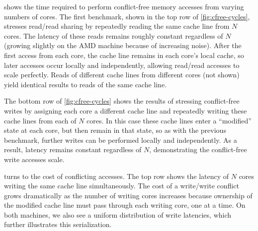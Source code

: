  shows the time required to perform
conflict-free memory accesses from varying numbers of cores.  The
first benchmark, shown in the top row of \cref{fig:cfree-cycles},
stresses read/read sharing by repeatedly reading the same cache line
from $N$ cores.  The latency of these reads remains roughly constant
regardless of $N$ (growing slightly on the AMD machine because of
increasing noise).  After the first access from each core, the cache
line remains in each core's local cache, so later accesses occur
locally and independently, allowing read/read accesses to scale
perfectly.  Reads of different cache lines from different cores (not
shown) yield identical results to reads of the same cache line.

The bottom row of \cref{fig:cfree-cycles} shows the results of
stressing conflict-free writes by assigning each core a different
cache line and repeatedly writing these cache lines from each of $N$
cores.  In this case these cache lines enter a ``modified'' state at
each core, but then remain in that state, so as with the previous
benchmark, further writes can be performed locally and independently.
As a result, latency remains constant regardless of $N$, demonstrating
the conflict-free write accesses scale.

\begin{figure}
  \centering
  
  \label{fig:conflict-cycles}
\end{figure}

 turns to the cost of conflicting
accesses.  The top row shows the latency of $N$ cores writing the same
cache line simultaneously.  The cost of a write/write conflict grows
dramatically as the number of writing cores increases because
ownership of the modified cache line must pass through each writing
core, one at a time.  On both machines, we also see a uniform
distribution of write latencies, which further illustrates this
serialization.

